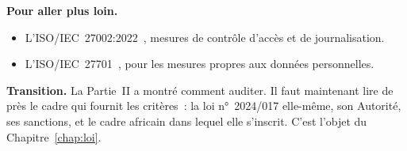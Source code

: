 \bigskip

\begin{boxinfo}
\textbf{Pour aller plus loin.}
\begin{itemize}
    \item L'ISO/IEC~27002:2022~\cite{iso27002_2022}, mesures de contrôle
          d'accès et de journalisation.
    \item L'ISO/IEC~27701~\cite{iso27701}, pour les mesures propres aux
          données personnelles.
\end{itemize}
\end{boxinfo}

\begin{boxinfo}
\textbf{Transition.} La Partie~II a montré comment auditer. Il faut
maintenant lire de près le cadre qui fournit les critères~: la loi
n°~2024/017 elle-même, son Autorité, ses sanctions, et le cadre africain
dans lequel elle s'inscrit. C'est l'objet du Chapitre~\ref{chap:loi}.
\end{boxinfo}

